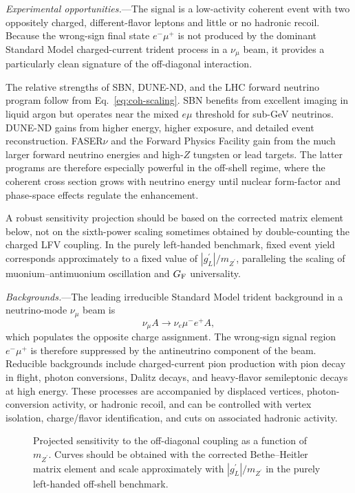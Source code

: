 \documentclass[
  aps,
  prl,
  twocolumn,
  superscriptaddress,
  amsmath, amssymb,
  floatfix, nofootinbib,
  longbibliography,
]{revtex4-2}
\newcommand{\numu}{\nu_\mu}
\newcommand{\nue}{\nu_e}
\newcommand{\Zp}{Z^{\prime}}
\newcommand{\GF}{G_{\rm F}}
\newcommand{\mZp}{m_{\Zp}}
\newcommand{\gL}{{g^{\prime}_L}}
\begin{document}
\textit{Experimental opportunities.}---The signal is a low-activity
coherent event with two oppositely charged, different-flavor leptons
and little or no hadronic recoil.  Because the wrong-sign final state
$e^-\mu^+$ is not produced by the dominant Standard Model
charged-current trident process in a $\numu$ beam, it provides a
particularly clean signature of the off-diagonal interaction.

The relative strengths of SBN, DUNE-ND, and the LHC forward neutrino
program follow from Eq.~\eqref{eq:coh-scaling}.  SBN benefits from
excellent imaging in liquid argon but operates near the mixed
$e\mu$ threshold for sub-GeV neutrinos.  DUNE-ND gains from higher
energy, higher exposure, and detailed event reconstruction.  FASER$\nu$
and the Forward Physics Facility gain from the much larger forward
neutrino energies and high-$Z$ tungsten or lead targets.  The latter
programs are therefore especially powerful in the off-shell regime,
where the coherent cross section grows with neutrino energy until
nuclear form-factor and phase-space effects regulate the enhancement.

A robust sensitivity projection should be based on the corrected
matrix element below, not on the sixth-power scaling sometimes obtained
by double-counting the charged LFV coupling.  In the purely left-handed
benchmark, fixed event yield corresponds approximately to a fixed value
of $|\gL|/\mZp$, paralleling the scaling of muonium--antimuonium
oscillation and $\GF$ universality.

\textit{Backgrounds.}---The leading irreducible Standard Model trident
background in a neutrino-mode $\numu$ beam is
\begin{equation}
  \numu A\to\nue\mu^-e^+A,
\end{equation}
which populates the opposite charge assignment.  The wrong-sign signal
region $e^-\mu^+$ is therefore suppressed by the antineutrino component
of the beam.  Reducible backgrounds include charged-current pion
production with pion decay in flight, photon conversions, Dalitz decays,
and heavy-flavor semileptonic decays at high energy.  These processes
are accompanied by displaced vertices, photon-conversion activity, or
hadronic recoil, and can be controlled with vertex isolation,
charge/flavor identification, and cuts on associated hadronic activity.

\begin{figure}[t]
  \centering
  \caption{Projected sensitivity to the off-diagonal coupling as a
    function of $\mZp$.  Curves should be obtained with the corrected
    Bethe--Heitler matrix element and scale approximately with
    $|\gL|/\mZp$ in the purely left-handed off-shell benchmark.}
  \label{fig:sens}
\end{figure}
\end{document}
